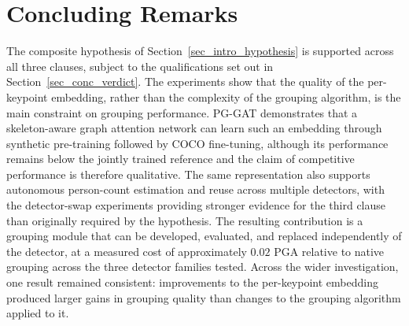 \section{Concluding Remarks}
\label{sec_conc_remarks}

The composite hypothesis of Section~\ref{sec_intro_hypothesis} is supported across all three clauses,
subject to the qualifications set out in Section~\ref{sec_conc_verdict}.
The experiments show that the quality of the per-keypoint embedding,
rather than the complexity of the grouping algorithm, is the main constraint on grouping performance.
PG-GAT demonstrates that a skeleton-aware graph attention network can learn such an embedding through
synthetic pre-training followed by COCO fine-tuning,
although its performance remains below the jointly trained reference and the claim of competitive performance
is therefore qualitative.
The same representation also supports autonomous person-count estimation and reuse across multiple detectors,
with the detector-swap experiments providing stronger evidence for the third clause than originally required
by the hypothesis.
The resulting contribution is a grouping module that can be developed, evaluated,
and replaced independently of the detector,
at a measured cost of approximately $0.02$ PGA relative to native grouping across the three detector families tested.
Across the wider investigation, one result remained consistent:
improvements to the per-keypoint embedding produced larger gains in grouping quality than changes to the
grouping algorithm applied to it.
